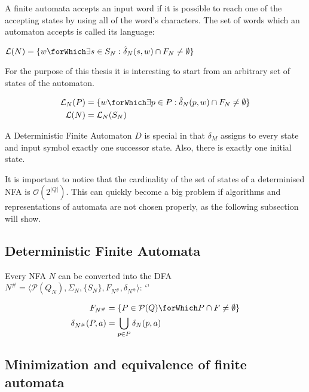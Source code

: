A finite automata accepts an input word if it is possible to reach one of the
accepting states by using all of the word's characters.
The set of words which an automaton accepts is called its language:

\begin{definition}
  $\mathcal{L}(N) = \{ w \forWhich \exists s \in S_N: \hat{\delta}_N(s, w) \cap F_N \neq \emptyset \}$
\end{definition}

For the purpose of this thesis it is interesting to start from an arbitrary set of states of the automaton.

\begin{definition}
  \begin{align*}
    \mathcal{L}_N(P) &= \{ w \forWhich \exists p \in P: \hat{\delta}_N(p, w) \cap F_N \neq \emptyset\}\\
    \mathcal{L}(N) &= \mathcal{L}_N(S_N)
  \end{align*}
\end{definition}

A Deterministic Finite Automaton $D$ is special in that $\delta_M$ assigns to
every state and input symbol exactly one successor state.
Also, there is exactly one initial state.

It is important to notice that the cardinality of the set of states of a
determinised NFA is $\mathcal{O}(2^{|Q|})$.
This can quickly become a big problem if algorithms and representations of
automata are not chosen properly, as the following subsection will show.


\subsection{Deterministic Finite Automata}

Every NFA $N$ can be converted into the DFA
$N^\# = \langle \mathcal{P}(Q_N), \Sigma_N, \{ S_N \}, F_{N^\#}, \delta_{N^\#} \rangle$:
`'
\begin{definition}
  \begin{align*}
    F_{N^\#} &= \{ P \in \mathcal{P}(Q) \forWhich P \cap F \neq \emptyset \}\\
    \delta_{N^\#}(P, a) &= \bigcup_{p \in P} \delta_N(p, a)
  \end{align*}
\end{definition}

\subsection{Minimization and equivalence of finite automata}

